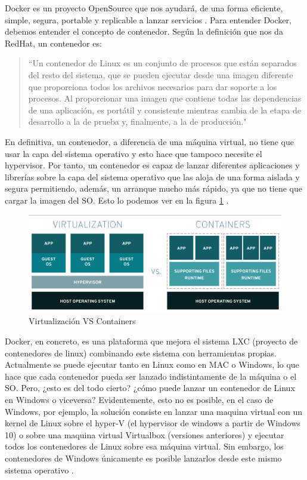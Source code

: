 Docker es un proyecto OpenSource que nos ayudará, de una forma eficiente, simple, segura, portable y replicable a lanzar servicios \cite{Dck-5} \cite{Dck-6}. Para entender Docker, debemos entender el concepto de contenedor. Según la definición que nos da RedHat, un contenedor es:\par
\begin{quote}

\small ``Un contenedor de Linux es un conjunto de procesos que están separados del resto del sistema, que se pueden ejecutar desde una imagen diferente que proporciona todos los archivos necesarios para dar soporte a los procesos. Al proporcionar una imagen que contiene todas las dependencias de una aplicación, es portátil y consistente mientras cambia de la etapa de desarrollo a la de prueba y, finalmente, a la de producción."\cite{Dck-7}\par

\end{quote}
En definitiva, un contenedor, a diferencia de una máquina virtual, no tiene que usar la capa del sistema operativo y esto hace que tampoco necesite el hypervisor. Por tanto, un contenedor es capaz de lanzar diferentes aplicaciones y librerías sobre la capa del sistema operativo que las aloja de una forma aislada y segura permitiendo, además, un arranque mucho más rápido, ya que no tiene que cargar la imagen del SO. Esto lo podemos ver en la figura \ref{dock-1} \cite{Dck-7}.\par

\begin{figure}[htp]
\centering
\includegraphics[scale=0.45]{Imagenes/dockervsvm1.png}
\caption{Virtualización VS Containers}
\label{dock-1}
\end{figure}

Docker, en concreto, es una plataforma que mejora el sistema LXC (proyecto de contenedores de linux) combinando este sistema con herramientas propias. Actualmente se puede ejecutar tanto en Linux como en MAC o Windows, lo que hace que cada contenedor pueda ser lanzado indistintamente de la máquina o el SO. Pero, ¿esto es del todo cierto? ¿cómo puede lanzar un contenedor de Linux en Windows o viceversa? Evidentemente, esto no es posible, en el caso de Windows, por ejemplo, la solución consiste en lanzar una maquina virtual con un kernel de Linux sobre el hyper-V (el hypervisor de windows a partir de Windows 10) o sobre una maquina virtual Virtualbox (versiones anteriores) y ejecutar todos los contenedores de Linux sobre esa máquina virtual. Sin embargo, los contenedores de Windows únicamente es posible lanzarlos desde este mismo sistema operativo \cite{Dck-10}. \par


